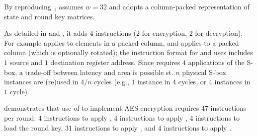 
By reproducing~\cite[Section 4.2]{TilGro:06},
assumes 
$w = 32$
and adopts a 
column-packed 
representation of state and round key matrices.

As detailed in
and
,
it adds
$ 4$
instructions ($2$ for encryption, $2$ for decryption).
For example
 applies   to elements in   a packed column,
and
 applies  to               a packed column (which is optionally rotated);
the instruction format for
and
uses 
includes $1$ source and $1$ destination register address.
Since 
requires $4$ applications of the S-box, a trade-off between latency and
area is possible st. 
$n$ physical S-box instances are (re)used in $4/n$ cycles
(e.g., $1$ instance in $4$ cycles, or $4$ instances in $1$ cycle).

demonstrates that use of  to implement AES encryption requires
$47$
instructions per round:
$ 4$   instructions to apply ,
$ 4$   instructions to apply ,
$ 4$            instructions to load the round key,
$31$                      instructions to apply ,
and
$ 4$            instructions to apply .

